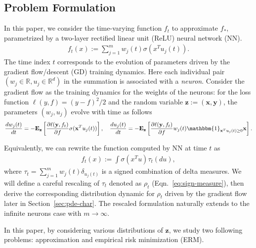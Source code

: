 \documentclass[11pt]{article}
\numberwithin{equation}{section}
\def\bd#1{\mathbf{#1}}
\def\bx{\bd{x}}
\def\by{\bd{y}}
\begin{document}
\subsection{Problem Formulation}
\label{sec:formulation}

In this paper, we consider the time-varying function $f_t$ to approximate $f_*$, parametrized by a two-layer rectified linear unit (ReLU) neural network (NN). 
\begin{align}\label{nn}
    f_t(x) := \sum_{j=1}^{m} w_j(t)\sigma(x^T u_j(t)). %
\end{align}
The time index $t$ corresponds to the evolution of parameters driven by the gradient flow/descent (GD) training dynamics. Here each individual pair $(w_j \in \mathbb{R},u_j \in \mathbb{R}^d)$ in the summation is associated with a \textit{neuron}. Consider the gradient flow as the training dynamics for the weights of the neurons: for the loss function $\ell(y, f)= (y -f)^2/2$ and the random variable $\bd{z} := (\bx,\bd{y})$, the parameters $(w_j,u_j)$ evolve with time as follows
\begin{align}
    \frac{dw_j(t)}{dt} = -\mathbf{E}_{\bd{z}}\left[\frac{\partial \ell(\by,f_t)}{\partial f}\sigma(\bx^Tu_j(t))\right],\quad
    \frac{du_j(t)}{dt} = -\mathbf{E}_{\bd{z}}\left[\frac{\partial \ell(\by,f_t)}{\partial f}w_j(t)\mathbbm{1}_{\bx^Tu_j(t)\geq0}\bx\right]. \label{eq:training_2}
\end{align}

Equivalently, we can rewrite the function computed by NN at time $t$ as 
\begin{align}\label{def:convex-nn}
    f_t(x) := \int \sigma(x^Tu) \tau_{t}(du),
\end{align}
where $\tau_{t} = \sum_{j=1}^m w_j(t) \delta_{u_j(t)}$ is a signed combination of delta measures. We will define a careful rescaling of $\tau_{t}$ denoted as $\rho_t$ (Eqn.~\eqref{eq:sign-measure}), then derive the corresponding distribution dynamic for $\rho_t$ driven by the gradient flow later in Section~\ref{sec:pde-char}. The rescaled formulation naturally extends to the infinite neurons case with $m \rightarrow \infty$. 


In this paper, by considering various distributions of $\bd{z}$, we study two following problems: approximation and empirical risk minimization (ERM). 
\end{document}
